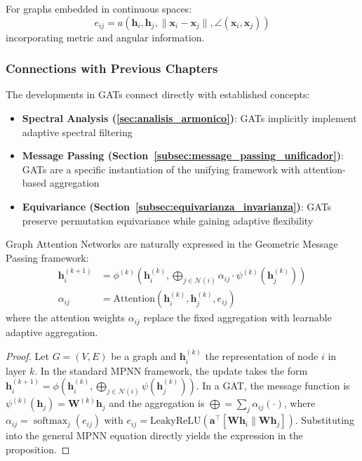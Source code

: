 \begin{definition}\label{def:continuous_geometric_attention}
For graphs embedded in continuous spaces:
\begin{equation}
    e_{ij} = a(\mathbf{h}_i, \mathbf{h}_j, \|\mathbf{x}_i - \mathbf{x}_j\|, \angle(\mathbf{x}_i, \mathbf{x}_j))
    \label{eq:continuous_geometric_attention}
\end{equation}
incorporating metric and angular information.
\end{definition}

\subsubsection{Connections with Previous Chapters}

The developments in GATs connect directly with established concepts:

\begin{itemize}
    \item \textbf{Spectral Analysis (\autoref{sec:analisis_armonico})}: GATs implicitly implement adaptive spectral filtering
    \item \textbf{Message Passing (Section~\ref{subsec:message_passing_unificador})}: GATs are a specific instantiation of the unifying framework with attention-based aggregation
    \item \textbf{Equivariance (Section~\ref{subsec:equivarianza_invarianza})}: GATs preserve permutation equivariance while gaining adaptive flexibility
\end{itemize}

\begin{proposition}\label{prop:gat_unified_framework}
Graph Attention Networks are naturally expressed in the Geometric Message Passing framework:
\begin{align}
    \mathbf{h}_i^{(k+1)} &= \phi^{(k)}\left(\mathbf{h}_i^{(k)}, \bigoplus_{j \in \mathcal{N}(i)} \alpha_{ij} \cdot \psi^{(k)}(\mathbf{h}_j^{(k)})\right) \\
    \alpha_{ij} &= \text{Attention}(\mathbf{h}_i^{(k)}, \mathbf{h}_j^{(k)}, e_{ij})
    \label{eq:gat_in_unified_framework}
\end{align}
where the attention weights $\alpha_{ij}$ replace the fixed aggregation with learnable adaptive aggregation.
\end{proposition}

\begin{proof}
Let $G = (V, E)$ be a graph and $\mathbf{h}_i^{(k)}$ the representation of node $i$ in layer $k$. In the standard MPNN framework, the update takes the form $\mathbf{h}_i^{(k+1)} = \phi(\mathbf{h}_i^{(k)}, \bigoplus_{j \in \mathcal{N}(i)} \psi(\mathbf{h}_j^{(k)}))$. In a GAT, the message function is $\psi^{(k)}(\mathbf{h}_j) = \mathbf{W}^{(k)} \mathbf{h}_j$ and the aggregation is $\bigoplus = \sum_{j} \alpha_{ij} (\cdot)$, where $\alpha_{ij} = \operatorname{softmax}_j(e_{ij})$ with $e_{ij} = \text{LeakyReLU}(\mathbf{a}^\top [\mathbf{W}\mathbf{h}_i \| \mathbf{W}\mathbf{h}_j])$. Substituting into the general MPNN equation directly yields the expression in the proposition.
\end{proof}


